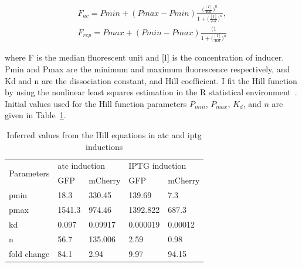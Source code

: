 \begin{align}
 	F_{ac} = Pmin + (Pmax - Pmin)\frac{\Big(\frac{[I]}{Kd}\Big)^n}{1+\Big(\frac{[I]}{Kd}\Big)^n},\\
 	F_{rep} = Pmax + (Pmin - Pmax)\frac{\Big(1}{1+\Big(\frac{[I]}{Kd}\Big)^n}
\end{align}
 
where F is the median fluorescent unit and [I] is the concentration of inducer. Pmin and Pmax are the minimum and maximum fluorescence respectively, and Kd and n are the dissociation constant, and Hill coefficient. I fit the Hill function by using the nonlinear least squares estimation in the R statistical environment~\autocite{R:2008}. Initial values used for the Hill function parameters $P_{min}$, $P_{max}$, $K_d$, and $n$ are given in Table~\ref{tab:hill_initial}.




\begin{table}[htbp]
\centering
\caption{Inferred values from the Hill equations in \acrshort{atc} and \acrshort{iptg} inductions}
\label{tab:hill_initial}
\begin{tabular}{@{}lllll@{}}
\toprule
\multirow{2}{*}{Parameters} & \multicolumn{2}{l}{\acrshort{atc} induction} & \multicolumn{2}{l}{IPTG induction} \\ \cmidrule(l){2-5} 
 & GFP & mCherry & GFP & mCherry \\ \midrule
pmin & 18.3 & 330.45 & 139.69 & 7.3 \\
pmax & 1541.3 & 974.46 & 1392.822 & 687.3 \\
kd & 0.097 & 0.09917 & 0.000019 & 0.00012\\
n & 56.7 & 135.006 & 2.59 & 0.98\\ 
fold change & 84.1 & 2.94 & 9.97 & 94.15 \\ \bottomrule
\end{tabular}
\end{table}

